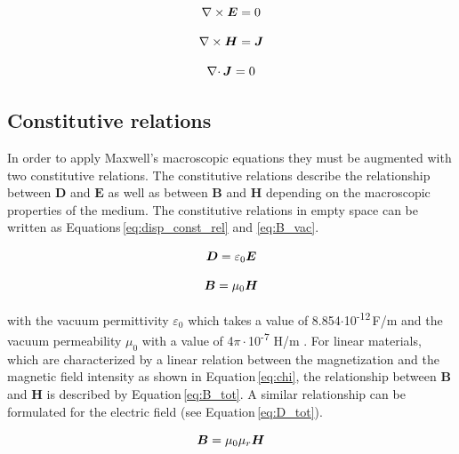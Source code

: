 \begin{equation}
\label{eq:Faraday_stat}
\centering
\nabla\times\boldsymbol{E} = 0
\end{equation}

\begin{equation}
\label{eq:Ampere_stat}
\centering
\nabla\times\boldsymbol{H} = \boldsymbol{J} 
\end{equation}

\begin{equation}
\label{eq:Konti_Mag_stat}
\centering
\nabla\cdotp\boldsymbol{J} = 0
\end{equation}

\subsection{Constitutive relations}
\label{subsec:const_rel}

In order to apply Maxwell's macroscopic equations they must be augmented with two constitutive relations. The constitutive relations describe the relationship between $\boldsymbol{D}$ and $\boldsymbol{E}$ as well as between $\boldsymbol{B}$ and $\boldsymbol{H}$ depending on the macroscopic properties of the medium. The constitutive relations in empty space can be written as Equations\,\ref{eq:disp_const_rel} and \ref{eq:B_vac}. 

\begin{equation}
\label{eq:disp_const_rel}
\centering
\boldsymbol{D} = \varepsilon_{0}\boldsymbol{E} 
\end{equation}

\begin{equation}
\label{eq:B_vac}
\centering
\boldsymbol{B} = \mu_{0}\boldsymbol{H}
\end{equation}

with the vacuum permittivity $\varepsilon_{0}$ which takes a value of 8.854$\cdotp$10\textsuperscript{-12}\,F/m and the vacuum permeability $\mu_{0}$ with a value of 4$\pi\cdotp$10\textsuperscript{-7} H/m \cite{monk2003finite,kallenbach2018elektromagnete}. For linear materials, which are characterized by a linear relation between the magnetization and the magnetic field intensity as shown in Equation\,\ref{eq:chi}, the relationship between $\boldsymbol{B}$ and $\boldsymbol{H}$ is described by Equation\,\ref{eq:B_tot}. A similar relationship can be formulated for the electric field (see Equation\,\ref{eq:D_tot}).    

\begin{equation}
\label{eq:B_tot}
\centering
\boldsymbol{B} = \mu_{0}\mu_{r}\boldsymbol{H}
\end{equation}

